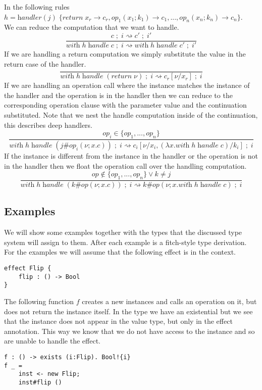 \documentclass[12pt]{article}
\newcommand\op[0]{op}
\newcommand\val[0]{\nu}
\newcommand\vabs[2]{\lambda #1 . #2}
\newcommand\vhandleri[2]{\textit{handler} ( #1 ) \; \{#2\}}
\newcommand\comp[0]{c}
\newcommand\creturn[1]{\textit{return} \; #1}
\newcommand\copi[5]{#1 \# #2(#3 ; #4 . #5)}
\newcommand\chandle[2]{\textit{with} \; #1 \; \textit{handle} \; #2}
\newcommand\sep[0]{\;;\;}
\begin{document}
In the following rules \\$h = 
	\vhandleri{j}{
		\textit{return} \; x_r \rightarrow \comp_r,
		\op_1(x_1 ; k_1) \rightarrow \comp_1,
		...,
		\op_n(x_n ; k_n) \rightarrow \comp_n
	}$.\\
We can reduce the computation that we want to handle.\\
\[\frac{
	\comp\sep i \rightsquigarrow \comp'\sep i'
}{
	\chandle{h}{\comp}\sep i \rightsquigarrow \chandle{h}{\comp'}\sep i'
}\]
If we are handling a return computation we simply substitute the value in the return case of the handler.\\
\[\frac{
}{
\chandle{h}{(\creturn{\val})}\sep i \rightsquigarrow \comp_r[\val/x_r]\sep i
}\]
If we are handling an operation call where the instance matches the instance of the handler and the operation is in the handler then we can reduce to the corresponding operation clause with the parameter value and the continuation substituted.
Note that we nest the handle computation inside of the continuation, this describes deep handlers.\\
\[\frac{
	\op_i \in \{\op_1, ..., \op_n \}
}{
	\chandle{h}{(\copi{j}{\op_i}{\val}{x}{\comp})}\sep i \rightsquigarrow \comp_i[\val/x_i, (\vabs{x}{\chandle{h}{\comp}})/k_i]\sep i
}\]
If the instance is different from the instance in the handler or the operation is not in the handler then we float the operation
call over the handling computation.\\
\[\frac{
	\op \notin \{\op_1, ..., \op_n \} \lor k \neq j
}{
	\chandle{h}{(\copi{k}{\op}{\val}{x}{\comp})}\sep i \rightsquigarrow \copi{k}{\op}{\val}{x}{\chandle{h}{\comp}}\sep i
}\]

\subsection{Examples}
We will show some examples together with the types that the discussed type system will assign to them.
After each example is a fitch-style type derivation.
For the examples we will assume that the following effect is in the context.
\begin{verbatim}
effect Flip {
	flip : () -> Bool
}
\end{verbatim}

The following function $f$ creates a new instances and calls an operation on it, but does not return the instance itself.
In the type we have an existential but we see that the instance does not appear in the value type, but only in the effect annotation. This way we know that we do not have access to the instance and so are unable to handle the effect.
\begin{verbatim}
f : () -> exists (i:Flip). Bool!{i}
f _ =
	inst <- new Flip;
	inst#flip ()
\end{verbatim}
\end{document}
